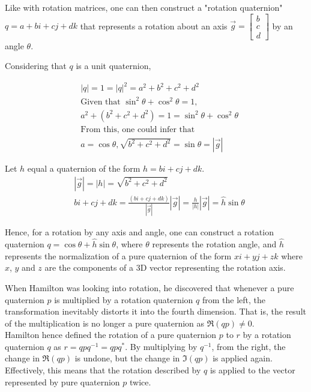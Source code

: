 \documentclass[12pt, a4paper]{article}
\begin{document}
Like with rotation matrices, one can then construct a "rotation quaternion" $q =
a + bi + cj +dk$ that represents a rotation about an axis $\vec{g} =
\begin{bmatrix} b \\ c \\ d \end{bmatrix}$ by an angle $\theta$. %

Considering that $q$ is a unit quaternion,

\begin{align*}
    &|q| = 1 = |q|^2 = a^2 + b^2 + c^2 + d^2 \\
    &\text{Given that } \sin^2\theta + \cos^2\theta = 1, \\
    &a^2 + (b^2 + c^2 + d^2) = 1 = \sin^2\theta + \cos^2\theta \\
    &\text{From this, one could infer that} \\
    &a = \cos\theta, \sqrt{b^2 + c^2 + d^2} = \sin\theta = |\vec{g}|
\end{align*}

Let $h$ equal a quaternion of the form $h = bi + cj + dk$.
\begin{align*}
    &|\vec{g}| = |h| = \sqrt{b^2 + c^2 + d^2} \\
    &bi + cj + dk = \frac{(bi + cj + dk)}{|\vec{g}|}|\vec{g}| = \frac{h}{|h|}|\vec{g}| = \hat{h}\sin\theta
\end{align*}

Hence, for a rotation by any axis and angle, one can construct a rotation
quaternion $q = \cos\theta + \hat{h}\sin\theta$, where $\theta$ represents the
rotation angle, and $\hat{h}$ represents the normalization of a pure quaternion
of the form $xi + yj + zk$ where $x$, $y$ and $z$ are the components of a 3D
vector representing the rotation axis. \\

\pagebreak

When Hamilton was looking into rotation, he discovered that whenever a pure
quaternion $p$ is multiplied by a rotation quaternion $q$ from the left, the
transformation inevitably distorts it into the fourth dimension. That is, the
result of the multiplication is no longer a pure quaternion as
$\Re(qp) \neq 0$. \\

Hamilton hence defined the rotation of a pure quaternion $p$ to $r$ by a
rotation quaternion $q$ as $r = qpq^{-1} = qpq^*$. By multiplying by $q^{-1}$, from the
right, the change in $\Re(qp)$ is undone, but the change in $\Im(qp)$ is applied
again. Effectively, this means that the rotation described by $q$ is applied to
the vector represented by pure quaternion $p$ twice. \\
\end{document}
